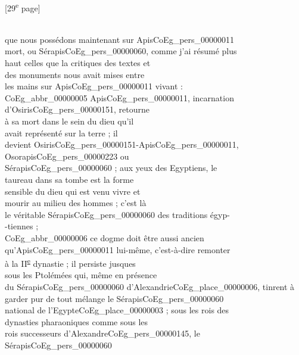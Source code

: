 \documentclass{book}
\begin{document}
{{\footnotesize\begin{center} {[29\textsuperscript{e} page]}\end{center}}

\begin{paracol}{2}
\noindent \\
\switchcolumn
\noindent que nous possédons maintenant sur Apis\gls{CoEg_pers_00000011}\\
mort, ou Sérapis\gls{CoEg_pers_00000060}, comme j’ai résumé plus\\
haut celles que la critiques des textes et\\
des monuments nous avait mises entre\\
les mains sur Apis\gls{CoEg_pers_00000011} vivant :\\
\indent \gls{CoEg_abbr_00000005} Apis\gls{CoEg_pers_00000011}, incarnation d’Osiris\gls{CoEg_pers_00000151}, retourne\\
à sa mort dans le sein du dieu qu’il\\
avait représenté sur la terre ; il\\
devient Osiris\gls{CoEg_pers_00000151}-Apis\gls{CoEg_pers_00000011}, Osorapis\gls{CoEg_pers_00000223} ou\\
Sérapis\gls{CoEg_pers_00000060} ; aux yeux des Egyptiens, le\\
taureau dans sa tombe est la forme\\
sensible du dieu qui est venu vivre et\\
mourir au milieu des hommes ; c’est là\\
le véritable Sérapis\gls{CoEg_pers_00000060} des traditions égyp-\\
-tiennes ;\\
\indent \gls{CoEg_abbr_00000006} ce dogme doit être aussi ancien\\
qu’Apis\gls{CoEg_pers_00000011} lui-même, c’est-à-dire remonter\\
à la II\textsuperscript{\underline{e}} dynastie ; il persiste jusques\\
sous les Ptolémées qui, même en présence\\
du Sérapis\gls{CoEg_pers_00000060} d’Alexandrie\gls{CoEg_place_00000006}, tinrent à\\
garder pur de tout mélange le Sérapis\gls{CoEg_pers_00000060}\\
national de l’Egypte\gls{CoEg_place_00000003} ; sous les rois des\\
dynasties pharaoniques comme sous les\\
rois successeurs d’Alexandre\gls{CoEg_pers_00000145}, le Sérapis\gls{CoEg_pers_00000060}\\

\end{paracol}}
\end{document}
